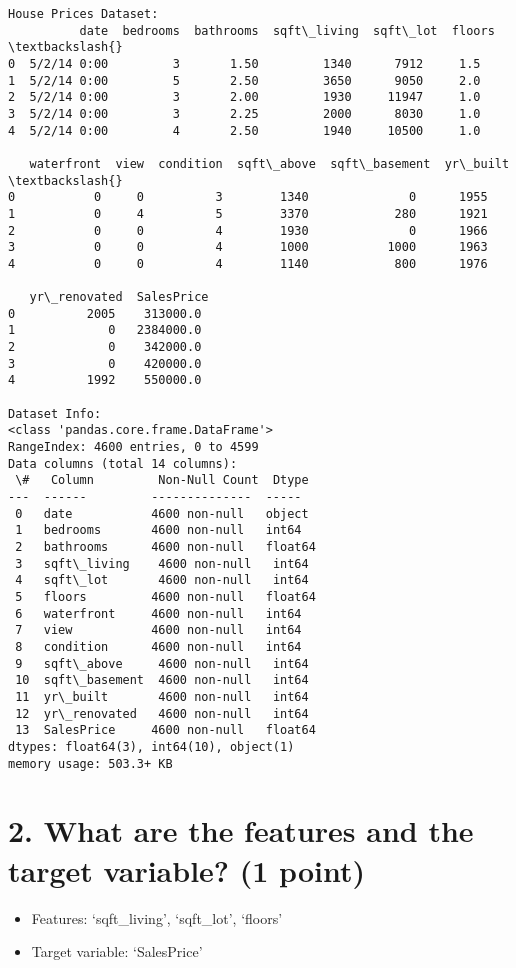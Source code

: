 \documentclass[11pt]{article}
\providecommand{\tightlist}{%
      \setlength{\itemsep}{0pt}\setlength{\parskip}{0pt}}
\begin{document}
    \begin{Verbatim}[commandchars=\\\{\}]
House Prices Dataset:
          date  bedrooms  bathrooms  sqft\_living  sqft\_lot  floors  \textbackslash{}
0  5/2/14 0:00         3       1.50         1340      7912     1.5
1  5/2/14 0:00         5       2.50         3650      9050     2.0
2  5/2/14 0:00         3       2.00         1930     11947     1.0
3  5/2/14 0:00         3       2.25         2000      8030     1.0
4  5/2/14 0:00         4       2.50         1940     10500     1.0

   waterfront  view  condition  sqft\_above  sqft\_basement  yr\_built  \textbackslash{}
0           0     0          3        1340              0      1955
1           0     4          5        3370            280      1921
2           0     0          4        1930              0      1966
3           0     0          4        1000           1000      1963
4           0     0          4        1140            800      1976

   yr\_renovated  SalesPrice
0          2005    313000.0
1             0   2384000.0
2             0    342000.0
3             0    420000.0
4          1992    550000.0

Dataset Info:
<class 'pandas.core.frame.DataFrame'>
RangeIndex: 4600 entries, 0 to 4599
Data columns (total 14 columns):
 \#   Column         Non-Null Count  Dtype
---  ------         --------------  -----
 0   date           4600 non-null   object
 1   bedrooms       4600 non-null   int64
 2   bathrooms      4600 non-null   float64
 3   sqft\_living    4600 non-null   int64
 4   sqft\_lot       4600 non-null   int64
 5   floors         4600 non-null   float64
 6   waterfront     4600 non-null   int64
 7   view           4600 non-null   int64
 8   condition      4600 non-null   int64
 9   sqft\_above     4600 non-null   int64
 10  sqft\_basement  4600 non-null   int64
 11  yr\_built       4600 non-null   int64
 12  yr\_renovated   4600 non-null   int64
 13  SalesPrice     4600 non-null   float64
dtypes: float64(3), int64(10), object(1)
memory usage: 503.3+ KB
    \end{Verbatim}

    \section{2. What are the features and the target variable? (1
point)}\label{what-are-the-features-and-the-target-variable-1-point}

\begin{itemize}
\tightlist
\item
  Features: `sqft\_living', `sqft\_lot', `floors'
\item
  Target variable: `SalesPrice'
\end{itemize}
\end{document}
